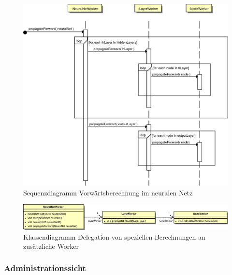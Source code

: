 \begin{figure}[H]
\begin{center}
\includegraphics[width=13cm]{Abbildungen/UML/uml_ronny/forwardPropagationSD.png}
\caption{Sequenzdiagramm Vorwärtsberechnung im neuralen Netz}
\label{fig_sdPropForw}
\end{center}
\end{figure}

\begin{figure}[H]
\begin{center}
\includegraphics[width=\textwidth]{Abbildungen/UML/uml_ronny/workerKlassenDiagramm.png}
\caption{Klassendiagramm Delegation von speziellen Berechnungen an zusätzliche Worker}
\label{fig_cdWorkerAndSubWorker}
\end{center}
\end{figure}

\subsubsection{Administrationssicht}

